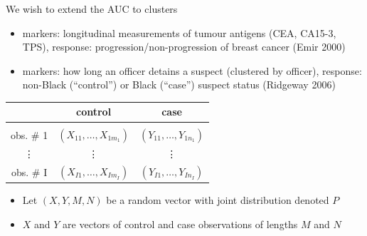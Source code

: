 \documentclass{beamer}
\newcommand{\I}{I}
\renewcommand{\P}{P}
\begin{document}
\begin{frame}
  We wish to extend the AUC to clusters



  \begin{itemize}
  \item markers: longitudinal measurements of tumour antigens (CEA,
    CA15-3, TPS), response: progression/non-progression of breast
    cancer (Emir 2000)



  \item markers: how long an officer detains a suspect (clustered by
    officer), response: non-Black (``control'') or Black (``case'')
    suspect status (Ridgeway 2006)
   \end{itemize}
 \end{frame}

 \begin{frame}
  \centering
  \begin{tabular}{c | c | c}
    & control & case\\
    \hline&&\\
    obs. \# 1 & $(X_{11},\ldots,X_{1m_1})$ & $(Y_{11},\ldots,Y_{1n_1})$\\
    \vdots & \vdots & \vdots\\
    obs. \# \I & $(X_{\I1},\ldots,X_{\I m_{\I}})$ & $(Y_{\I1},\ldots,Y_{\I n_{\I}})$\\
  \end{tabular}
 \begin{itemize}
  \item     Let $(X,Y,M,N)$ be a random vector
    with joint distribution denoted $\P$
  \item $X$ and $Y$ are vectors of control and case observations of lengths $M$ and $N$
  \end{itemize}
\end{frame}
\end{document}
